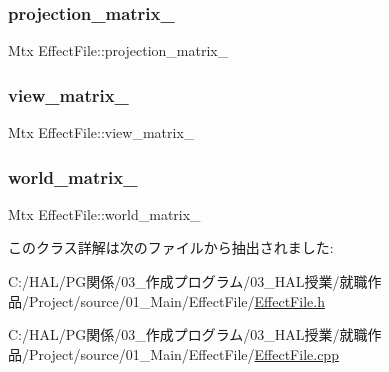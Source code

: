 \mbox{\label{class_effect_file_a3be0a571b431f3e317b53addeb8a284a}} 
\subsubsection{\texorpdfstring{projection\+\_\+matrix\+\_\+}{projection\_matrix\_}}
{\footnotesize\ttfamily Mtx Effect\+File\+::projection\+\_\+matrix\+\_\+}

\mbox{\label{class_effect_file_a71209896998fbe94eb0ab4633784e126}} 
\subsubsection{\texorpdfstring{view\+\_\+matrix\+\_\+}{view\_matrix\_}}
{\footnotesize\ttfamily Mtx Effect\+File\+::view\+\_\+matrix\+\_\+}

\mbox{\label{class_effect_file_a95cfdd66e61e80e39238d5f889488a43}} 
\subsubsection{\texorpdfstring{world\+\_\+matrix\+\_\+}{world\_matrix\_}}
{\footnotesize\ttfamily Mtx Effect\+File\+::world\+\_\+matrix\+\_\+}



このクラス詳解は次のファイルから抽出されました\+:\begin{DoxyCompactItemize}
\item 
C\+:/\+H\+A\+L/\+P\+G関係/03\+\_\+作成プログラム/03\+\_\+\+H\+A\+L授業/就職作品/\+Project/source/01\+\_\+\+Main/\+Effect\+File/\mbox{\hyperlink{_effect_file_8h}{Effect\+File.\+h}}\item 
C\+:/\+H\+A\+L/\+P\+G関係/03\+\_\+作成プログラム/03\+\_\+\+H\+A\+L授業/就職作品/\+Project/source/01\+\_\+\+Main/\+Effect\+File/\mbox{\hyperlink{_effect_file_8cpp}{Effect\+File.\+cpp}}\end{DoxyCompactItemize}
